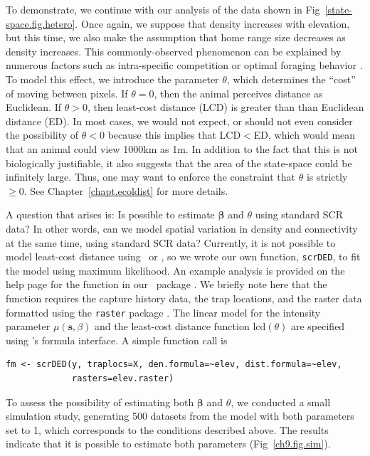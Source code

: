 To demonstrate, we continue with our analysis of the data shown in
Fig~\ref{state-space.fig.hetero}. Once again, we suppose that density
increases with elevation, but this time, we also make the
assumption that home range size decreases as density increases. This
commonly-observed phenomenon can be explained by numerous factors such
as intra-specific competition \citep{sillett_etal:2004} or optimal
foraging behavior \citep{tufto_etal:1996,said_servanty:2005}. To model
this effect, we
introduce the parameter $\theta$, which determines the ``cost'' of
moving between pixels. If $\theta=0$, then the animal perceives
distance as Euclidean. If $\theta>0$, then least-cost distance (LCD)
is greater than than Euclidean distance (ED). In most cases, we would
not expect,
or should not even consider the possibility of $\theta<0$ because this
implies that LCD$<$ED, which would mean that an animal could view
1000km as 1m. In addition to the fact that this is not biologically
justifiable, it also suggests that the area of the state-space could
be infinitely large. Thus, one may want to enforce the constraint that
$\theta$ is strictly $\geq 0$. See Chapter~\ref{chapt.ecoldist} for
more details.

A question that arises is: Is possible to estimate $\bm \beta$
and $\theta$ using standard SCR data? In other words, can we model
spatial variation in density and connectivity at the same time,
using standard SCR data? Currently, it is not possible to
model least-cost distance using \jags~or \secr, so we wrote our own
function, \verb+scrDED+, to fit the model using maximum likelihood. An
example analysis is provided on the help page for the function in our
\R~package \scrbook. We briefly note here that the function requires
the capture history data, the trap locations, and the raster data
formatted using the {\tt raster} package
\citep{hijmans_vanetten:2012}. The linear model for the
intensity parameter $\mu(\mathbf{s}, \beta)$ and the least-cost distance
function $\text{lcd}(\theta)$ are specified using \R's formula interface. A
simple function call is
\begin{verbatim}
fm <- scrDED(y, traplocs=X, den.formula=~elev, dist.formula=~elev,
             rasters=elev.raster)
\end{verbatim}
To assess the possibility of estimating both $\bm \beta$ and $\theta$, we
conducted a small simulation study, generating 500 datasets from the
model with both parameters set to 1, which corresponds to the
conditions described above. The results indicate that it is
possible to estimate both parameters
(Fig~\ref{ch9.fig.sim}).

